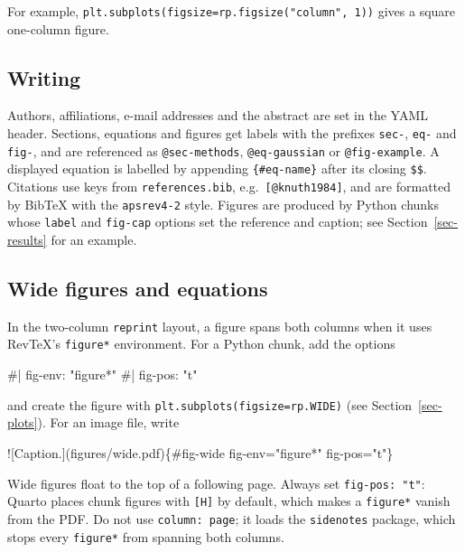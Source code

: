 \documentclass[
  aps,
  pra,
  reprint,
  superscriptaddress]{revtex4-2}
\newenvironment{Shaded}{\begin{snugshade}}{\end{snugshade}}
\newcommand{\AlertTok}[1]{\textcolor[rgb]{0.68,0.00,0.00}{#1}}
\newcommand{\CommentTok}[1]{\textcolor[rgb]{0.37,0.37,0.37}{#1}}
\newcommand{\NormalTok}[1]{\textcolor[rgb]{0.00,0.23,0.31}{#1}}
\begin{document}
For example, \texttt{plt.subplots(figsize=rp.figsize("column",\ 1))}
gives a square one-column figure.

\subsection{Writing}\label{writing}

Authors, affiliations, e-mail addresses and the abstract are set in the
YAML header. Sections, equations and figures get labels with the
prefixes \texttt{sec-}, \texttt{eq-} and \texttt{fig-}, and are
referenced as \texttt{@sec-methods}, \texttt{@eq-gaussian} or
\texttt{@fig-example}. A displayed equation is labelled by appending
\texttt{\{\#eq-name\}} after its closing \texttt{\$\$}. Citations use
keys from \texttt{references.bib}, e.g.~\texttt{{[}@knuth1984{]}}, and
are formatted by BibTeX with the \texttt{apsrev4-2} style. Figures are
produced by Python chunks whose \texttt{label} and \texttt{fig-cap}
options set the reference and caption; see Section~\ref{sec-results} for
an example.

\subsection{Wide figures and
equations}\label{wide-figures-and-equations}

In the two-column \texttt{reprint} layout, a figure spans both columns
when it uses RevTeX's \texttt{figure*} environment. For a Python chunk,
add the options

\begin{Shaded}
\begin{Highlighting}[]
\CommentTok{\#| fig{-}env: "figure*"}
\CommentTok{\#| fig{-}pos: "t"}
\end{Highlighting}
\end{Shaded}

and create the figure with \texttt{plt.subplots(figsize=rp.WIDE)} (see
Section~\ref{sec-plots}). For an image file, write

\begin{Shaded}
\begin{Highlighting}[]
\AlertTok{![Caption.](figures/wide.pdf)}\NormalTok{\{\#fig{-}wide}
\NormalTok{  fig{-}env="figure*" fig{-}pos="t"\}}
\end{Highlighting}
\end{Shaded}

Wide figures float to the top of a following page. Always set
\texttt{fig-pos:\ "t"}: Quarto places chunk figures with
\texttt{{[}H{]}} by default, which makes a \texttt{figure*} vanish from
the PDF. Do not use \texttt{column:\ page}; it loads the
\texttt{sidenotes} package, which stops every \texttt{figure*} from
spanning both columns.
\end{document}
